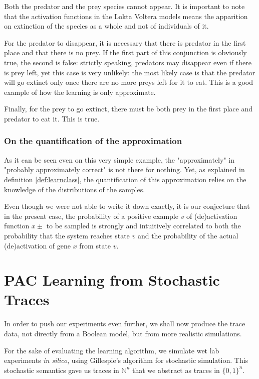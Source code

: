 \documentclass{llncs}
\begin{document}
Both the predator and the prey species cannot appear. It is important to note that the activation functions in the Lokta Voltera models means the apparition on extinction of the species as a whole and not of individuals of it.

For the predator to disappear, it is necessary that there is predator in the first place and that there is no prey. If the first part of this conjunction is obviously true, the second is false: strictly speaking, predators may disappear even if there is prey left, yet this case is very unlikely: the most likely case is that the predator will go extinct only once there are no more preys left for it to eat. This is a good example of how the learning is only approximate.

Finally, for the prey to go extinct, there must be both prey in the first place and predator to eat it. This is true.

\subsubsection{On the quantification of the approximation}

As it can be seen even on this very simple example, the "approximately" in "probably approximately correct" is not there for nothing. Yet, as explained in definition \ref{def:learnclass}, the quantification of this approximation relies on the knowledge of the distributions of the samples.

Even though we were not able to write it down exactly, it is our conjecture that in the present case, the probability of a positive example $v$ of (de)activation function $x\pm$ to be sampled is strongly and intuitively correlated to both the probability that the system reaches state $v$ and the probability of the actual (de)activation of gene $x$ from state $v$. 



\section{PAC Learning from Stochastic Traces}

In order to push our experiments even further, we shall now produce the trace
data, not directly from a Boolean model, but from more realistic simulations.

For the sake of evaluating the learning algorithm,
we simulate wet lab experiments \emph{in silico}, using Gillespie's algorithm for stochastic simulation.
This stochastic semantics gave us traces in ${\mathbb{N}}^n$ that we abstract as traces in ${\{0,1\}}^n$.
\end{document}
